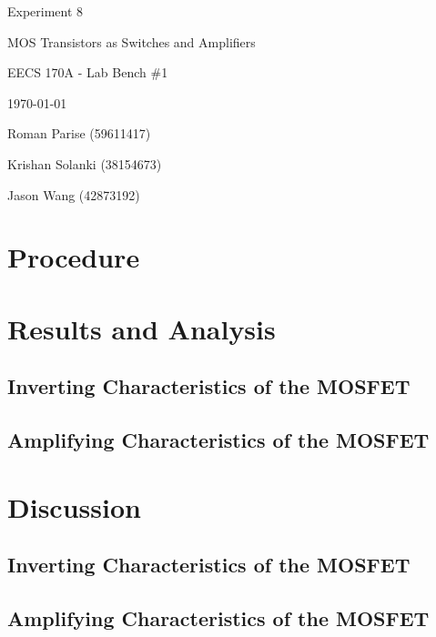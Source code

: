\documentclass{article}
\begin{document}
\begin{titlepage}
	\centering
	\vspace{2.5cm}
	\vspace{1cm}
	{\huge Experiment 8 \par}
	{\LARGE MOS Transistors as Switches and Amplifiers \par}
	{\Large EECS 170A - Lab Bench \#1 \par}
	{\Large \today \par}
	\vspace{1cm}
	{\large Roman Parise (59611417) \par}
	{\large Krishan Solanki (38154673) \par}
	{\large Jason Wang (42873192) \par}
	\vspace{1cm}
\end{titlepage}
\section{Procedure}

\section{Results and Analysis}
\subsection{Inverting Characteristics of the MOSFET}

\subsection{Amplifying Characteristics of the MOSFET}
%
\section{Discussion}
\subsection{Inverting Characteristics of the MOSFET}

\subsection{Amplifying Characteristics of the MOSFET}
%
\end{document}
